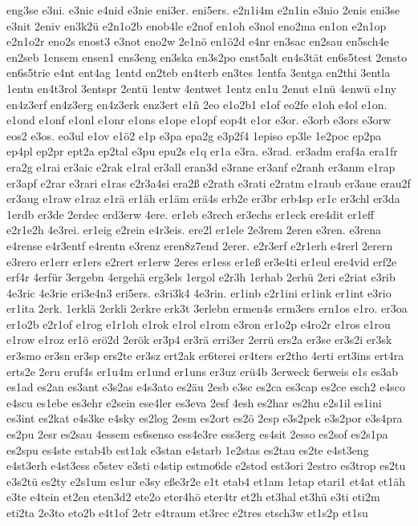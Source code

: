 {eng3se
e3ni.
e3nic
e4nid
e3nie
eni3er.
eni5ers.
e2n1i4m
e2n1in
e3nio
2enis
eni3se
e3nit
2eniv
en3k2ü
e2n1o2b
enob4le
e2nof
en1oh
e3nol
eno2ma
en1on
e2n1op
e2n1o2r
eno2s
enost3
e3not
eno2w
2e1nö
en1ö2d
e4nr
en3sac
en2sau
en5sch4e
en2seb
1ensem
ensen1
ens3eng
en3ska
en3s2po
enst5alt
en4s3tät
en6s5test
2ensto
en6s5trie
e4nt
ent4ag
1entd
en2teb
en4terb
en3tes
1entfa
3entga
en2thi
3entla
1entn
en4t3rol
3entspr
2entü
1entw
4entwet
1entz
en1u
2enut
e1nü
4enwü
e1ny
en4z3erf
en4z3erg
en4z3erk
enz3ert
e1ñ
2eo
e1o2b1
e1of
eo2fe
e1oh
e4ol
e1on.
e1ond
e1onf
e1onl
e1onr
e1ons
e1ope
e1opf
eop4t
e1or
e3or.
e3orb
e3ors
e3orw
eos2
e3os.
eo3ul
e1ov
e1ö2
e1p
e3pa
epa2g
e3p2f4
1episo
ep3le
1e2poc
ep2pa
ep4pl
ep2pr
ept2a
ep2tal
e3pu
epu2s
e1q
er1a
e3ra.
e3rad.
er3adm
eraf4a
era1fr
era2g
e1rai
er3aic
e2rak
e1ral
er3all
eran3d
e3rane
er3anf
e2ranh
er3anm
e1rap
er3apf
e2rar
e3rari
e1ras
e2r3a4si
era2ß
e2rath
e3rati
e2ratm
e1raub
er3aue
erau2f
er3aug
e1raw
e1raz
e1rä
er1äh
er1äm
erä4s
erb2e
er3br
erb4sp
er1c
er3chl
er3da
1erdb
er3de
2erdec
erd3erw
4ere.
er1eb
e3rech
er3echs
er1eck
ere4dit
er1eff
e2r1e2h
4e3rei.
er1eig
e2rein
e4r3eis.
ere2l
er1ele
2e3rem
2eren
e3ren.
e3rena
e4rense
e4r3entf
e4rentn
e3renz
eren8z7end
2erer.
e2r3erf
e2r1erh
e4rerl
2erern
e3rero
er1err
er1ers
e2rert
er1erw
2eres
er1ess
er1eß
er3e4ti
er1eul
ere4vid
erf2e
erf4r
4erfür
3ergebn
4ergehä
erg3els
1ergol
e2r3h
1erhab
2erhü
2eri
e2riat
e3rib
4e3ric
4e3rie
eri3e4n3
eri5ers.
e3ri3k4
4e3rin.
er1inb
e2r1ini
er1ink
er1int
e3rio
er1ita
2erk.
1erklä
2erkli
2erkre
erk3t
3erlebn
ermen4s
erm3ers
ern1os
e1ro.
er3oa
er1o2b
e2r1of
e1rog
e1r1oh
e1rok
e1rol
e1rom
e3ron
er1o2p
e4ro2r
e1ros
e1rou
e1row
e1roz
er1ö
erö2d
2erök
er3p4
er3rä
erri3er
2errü
ers2a
er3se
er3s2i
er3sk
er3smo
er3sn
er3sp
ers2te
er3sz
ert2ak
er6terei
er4ters
er2tho
4erti
ert3ins
ert4ra
erts2e
2eru
eruf4s
er1u4m
er1und
er1uns
er3uz
erü4b
3erweck
6erweis
e1s
es3ab
es1ad
es2an
es3ant
e3s2as
e4s3ato
es2äu
2esb
e3sc
es2ca
es3cap
es2ce
esch2
e4sco
e4scu
es1ebe
es3ehr
e2sein
ese4ler
es3eva
2esf
4esh
es2har
es2hu
e2s1il
es1ini
es3int
es2kat
e4s3ke
e4sky
es2log
2esm
es2ort
es2ö
2esp
e3s2pek
e3s2por
e3s4pra
es2pu
2esr
es2sau
4essem
es6senso
ess4e3re
ess3erg
es4sit
2esso
es2sof
es2s1pa
es2spu
es4ste
estab4b
est1ak
e3stan
e4starb
1e2stas
es2tau
es2te
e4st3eng
e4st3erh
e4st3ess
e5stev
e3sti
e4stip
estmo6de
e2stod
est3ori
2estro
es3trop
es2tu
e3s2tü
es2ty
e2s1um
es1ur
e3sy
eße3r2e
e1t
etab4
et1am
1etap
etari1
et4at
et1äh
e3te
e4tein
et2en
eten3d2
ete2o
eter4hö
eter4tr
et2h
et3hal
et3hü
e3ti
eti2m
eti2ta
2e3to
eto2b
e4t1of
2etr
e4traum
et3rec
e2tres
etsch3w
et1s2p
et1su
}

